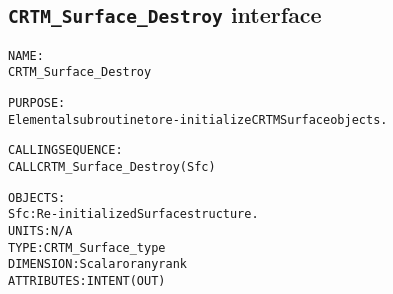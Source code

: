 \subsection{\texttt{CRTM\_Surface\_Destroy} interface}
  \label{sec:CRTM_Surface_Destroy_interface}
  \begin{alltt}
 
  NAME:
        CRTM_Surface_Destroy
  
  PURPOSE:
        Elemental subroutine to re-initialize CRTM Surface objects.
 
  CALLING SEQUENCE:
        CALL CRTM_Surface_Destroy( Sfc )
 
  OBJECTS:
        Sfc:          Re-initialized Surface structure.
                      UNITS:      N/A
                      TYPE:       CRTM_Surface_type
                      DIMENSION:  Scalar or any rank
                      ATTRIBUTES: INTENT(OUT)
 
  \end{alltt}
